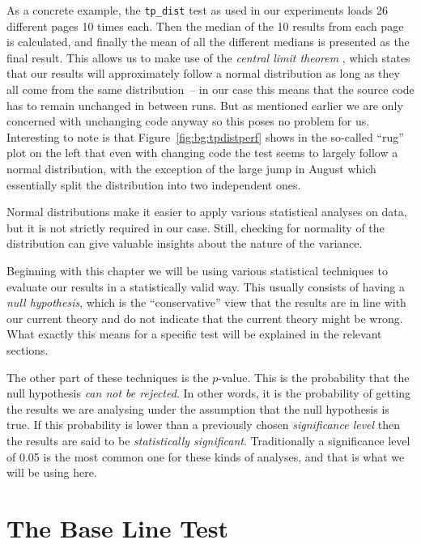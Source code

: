 As a concrete example, the \texttt{tp\_dist} test as used in our experiments
loads 26 different pages 10 times each. Then the median of the 10 results from
each page is calculated, and finally the mean of all the different medians is
presented as the final result. This allows us to make use of the \emph{central
limit theorem} \citep{cam_central_1986}, which states that our results will
approximately follow a normal distribution as long as they all come from the
same distribution~-- in our case this means that the source code has to remain
unchanged in between runs. But as mentioned earlier we are only concerned with
unchanging code anyway so this poses no problem for us. Interesting to note is
that Figure~\ref{fig:bg:tpdistperf} shows in the so-called ``rug'' plot on the
left that even with changing code the test seems to largely follow a normal
distribution, with the exception of the large jump in August which essentially
split the distribution into two independent ones.

Normal distributions make it easier to apply various statistical analyses on
data, but it is not strictly required in our case. Still, checking for
normality of the distribution can give valuable insights about the nature of
the variance.

Beginning with this chapter we will be using various statistical techniques to
evaluate our results in a statistically valid way. This usually consists of
having a \emph{null hypothesis}, which is the ``conservative'' view that the
results are in line with our current theory and do not indicate that the
current theory might be wrong. What exactly this means for a specific test
will be explained in the relevant sections.

The other part of these techniques is the $p$-value. This is the probability
that the null hypothesis \emph{can not be rejected}. In other words, it is the
probability of getting the results we are analysing under the assumption that
the null hypothesis is true. If this probability is lower than a previously
chosen \emph{significance level} then the results are said to be
\emph{statistically significant}. Traditionally a significance level of 0.05
is the most common one for these kinds of analyses, and that is what we will
be using here.

\section{The Base Line Test} %
\label{sec:bg:base}

